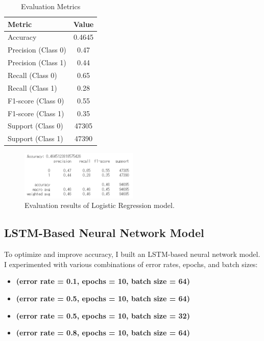 \begin{table}[h!]
\centering
\caption{Evaluation Metrics}
\label{tab:evaluation_metrics}
\begin{tabular}{|l|c|}
\hline
\textbf{Metric} & \textbf{Value} \\
\hline
Accuracy        & 0.4645 \\
\hline
Precision (Class 0)       & 0.47 \\
\hline
Precision (Class 1)       & 0.44 \\
\hline
Recall (Class 0)       & 0.65 \\
\hline
Recall (Class 1)       & 0.28 \\
\hline
F1-score (Class 0)       & 0.55 \\
\hline
F1-score (Class 1)       & 0.35 \\
\hline
Support (Class 0)       & 47305 \\
\hline
Support (Class 1)       & 47390 \\
\hline
\end{tabular}
\end{table}

\begin{figure}[h!]
    \centering
    \includegraphics[width=0.5\textwidth]{Figures/LogiReg_result.png}
    \caption{Evaluation results of Logistic Regression model.}
    \label{fig:logreg_results}
\end{figure}

\subsection{LSTM-Based Neural Network Model}

To optimize and improve accuracy, I built an LSTM-based neural network model. I experimented with various combinations of error rates, epochs, and batch sizes:

\begin{itemize}
    \item \textbf{(error rate = 0.1, epochs = 10, batch size = 64)}
    \item \textbf{(error rate = 0.5, epochs = 10, batch size = 64)}
    \item \textbf{(error rate = 0.5, epochs = 10, batch size = 32)}
    \item \textbf{(error rate = 0.8, epochs = 10, batch size = 64)}
\end{itemize}

